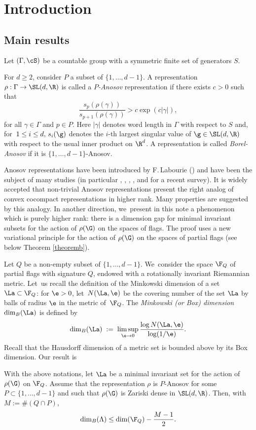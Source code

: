 \section{Introduction}

\subsection{Main results}

Let \((\Gamma,\cS)\) be a countable group with a symmetric finite set of generators \(S\).

For \(d \ge 2\), consider \(P\) a subset of \(\lbrace 1,\ldots, d-1\rbrace\).
A representation \(\rho: \Gamma \to \SL(d,\R)\)
is called a {\it{\(P\)-Anosov}} representation if there exists \(c > 0\) such that
\[
\frac{s_{p}(\rho(\gamma))}{s_{p+1}(\rho(\gamma))} > c\exp(c|\gamma|),
\]
for all \(\gamma \in \Gamma\) and \(p \in P\). Here \(|\gamma|\) denotes word length in \(\Gamma\) with respect to \(S\) and, for~\(1\le i\le d, \, s_i(\g)\) denotes the \(i\)-th largest singular value of \(\g \in \SL(d,\R)\) with respect to the usual inner product on \(\R^d\). A representation is called {\it{Borel-Anosov}} if it is \(\lbrace 1,\ldots, d-1\rbrace\)-Anosov.

Anosov representations have been introduced by F.\,Labourie (\cite{Lab06}) and have been the subject of many studies (\cf in particular \cite{GGKW17}, \cite {KLP16}, \cite{KLP17}, \cite{KLP18a}, \cite{BPS19} and \cite{canary} for a recent survey). It is widely accepted that non-trivial Anosov representations present the right analog of convex cocompact representations in higher rank. Many properties are suggested by this analogy. In another direction, we~present in this note a phenomenon which is purely higher rank: there is a dimension gap for minimal invariant subsets for the action of \(\rho (\G) \) on the spaces of flags. The proof uses a new variational principle for the action of \(\rho (\G) \) on the spaces of partial flags (see below Theorem \ref{theoremb}).

Let \(Q\) be a non-empty subset of \(\lbrace 1,\ldots, d-1 \rbrace\). We~consider the space \(\F_Q\) of partial flags with signature \(Q\), endowed with a rotationally invariant Riemannian metric. Let~us recall the definition of the Minkowski dimension of a set \(\La \subset \F_Q\): for \(\e >0\), let~\(N(\La, \e) \) be the covering number of the set \(\La \) by balls of radius \(\e\) in the metric of~\(\F_Q\). The {\it {Minkowski (or Box) dimension }} \(\dim_B(\La) \) is defined by
\[
 \dim_B (\La) \; : =\; \limsup_{\e \to 0} \frac{\log N(\La, \e)}{\log (1/\e)}.
\]
Recall that the Hausdorff dimension of a metric set is bounded above by its Box dimension. Our result is
\begin{theorem}\label{main}
With the above notations, let \(\La\) be a minimal invariant set for the action of \(\rho (\G) \) on \(\F_Q\). Assume that the representation \(\rho\) is \(P\)-Anosov for some \(P \subset \lbrace 1,\ldots, d-1 \rbrace\) and such that \(\rho (\G)\) is Zariski dense in \(\SL(d,\R)\). Then, with \(M := \# (Q \cap P)\),
\[
\dim_B(\Lambda) \le \dim(\F_Q) - \frac{M - 1}{2}.
\]
\end{theorem}

